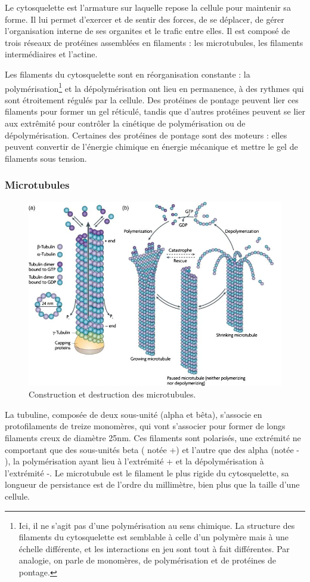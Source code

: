 Le cytosquelette est l'armature sur laquelle repose la cellule pour maintenir sa forme. Il lui permet d'exercer et de sentir des forces, de se déplacer, de gérer l'organisation interne de ses organites et le trafic entre elles. Il est composé de trois réseaux de protéines assemblées en filaments : les microtubules, les filaments intermédiaires et l'actine. 

Les filaments du cytosquelette sont en réorganisation constante : la polymérisation\footnote{Ici, il ne s'agit pas d'une polymérisation au sens chimique. La structure des filaments du cytosquelette est semblable à celle d'un polymère mais à une échelle différente, et les interactions en jeu sont tout à fait différentes. Par analogie, on parle de monomères, de polymérisation et de protéines de pontage.} et la dépolymérisation ont lieu en permanence, à des rythmes qui sont étroitement régulés par la cellule. 
Des protéines de pontage peuvent lier ces filaments pour former un gel réticulé, tandis que d'autres protéines peuvent se lier aux extrêmité pour contrôler la cinétique de polymérisation ou de dépolymérisation. Certaines des protéines de pontage sont des moteurs : elles peuvent convertir de l'énergie chimique en énergie mécanique et mettre le gel de filaments sous tension. 

\subsubsection{Microtubules}

\begin{figure}
\includegraphics[scale=0.5]{Microtubule.png}
\caption{Construction et destruction des microtubules. }
\end{figure}
La tubuline, composée de deux sous-unité (alpha et bêta), s'associe en protofilaments de treize monomères, qui vont s'associer pour former de longs filaments creux de diamètre 25nm. Ces filaments sont polarisés, une extrémité ne comportant que des sous-unités beta ( notée +) et l'autre que des alpha (notée - ), la polymérisation ayant lieu à l'extrémité + et la dépolymérisation à l'extrémité -. 
Le microtubule est le filament le plus rigide du cytosquelette, sa longueur de persistance est de l'ordre du millimètre, bien plus que la taille d'une cellule. 

